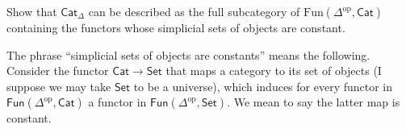 \begin{exercise}[1.2]
\label{exercise-enriched-simplicial-set-categories-are-subcategory-of-Fun}
Show that $\mathsf{Cat}_\Delta$ can be described as the full
subcategory of $\text{Fun}(\Delta^{\text{op}},\mathsf{Cat})$
containing the functors whose simplicial sets of objects
are constant.
\end{exercise}

\begin{remark}
\label{remark-induced-functor-on-objects}
The phrase ``simplicial sets of objects are constants''
means the following. Consider the functor
$\mathsf{Cat} \to \mathsf{Set}$ that maps a category to its set
of objects (I suppose we may take $\mathsf{Set}$ to be a universe),
which induces for every functor in
$\mathsf{Fun}(\Delta^{\text{op}},\mathsf{Cat})$ 
a functor in $\mathsf{Fun}(\Delta^{\text{op}},\mathsf{Set})$.
We mean to say the latter map is constant.
\end{remark}

